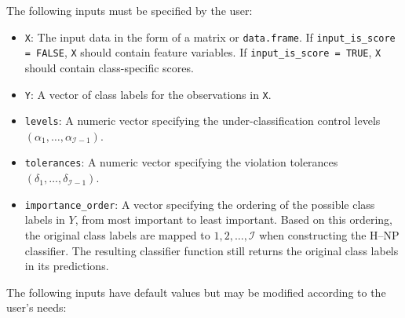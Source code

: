 \noindent The following inputs must be specified by the user:


\begin{itemize}
\item \texttt{X}: The input data in the form of a matrix or \texttt{data.frame}. If \texttt{input\_is\_score = FALSE}, \texttt{X} should contain feature variables. If \texttt{input\_is\_score = TRUE}, \texttt{X} should contain class-specific scores.

  \item \texttt{Y}: A vector of class labels for the observations in \texttt{X}. 

  \item \texttt{levels}: A numeric vector specifying the under-classification control levels \((\alpha_1, \ldots, \alpha_{\mathcal{I}-1})\).

  \item \texttt{tolerances}: A numeric vector specifying the violation tolerances \((\delta_1, \ldots, \delta_{\mathcal{I}-1})\).
  
\item \texttt{importance\_order}: A vector specifying the ordering of the possible class labels in \(Y\), from most important to least important. Based on this ordering, the original class labels are mapped to \(1, 2, \ldots, \mathcal{I}\) when constructing the H--NP classifier. The resulting classifier function still returns the original class labels in its predictions.


\end{itemize}

\noindent The following inputs have default values but may be modified according to the user's needs:



